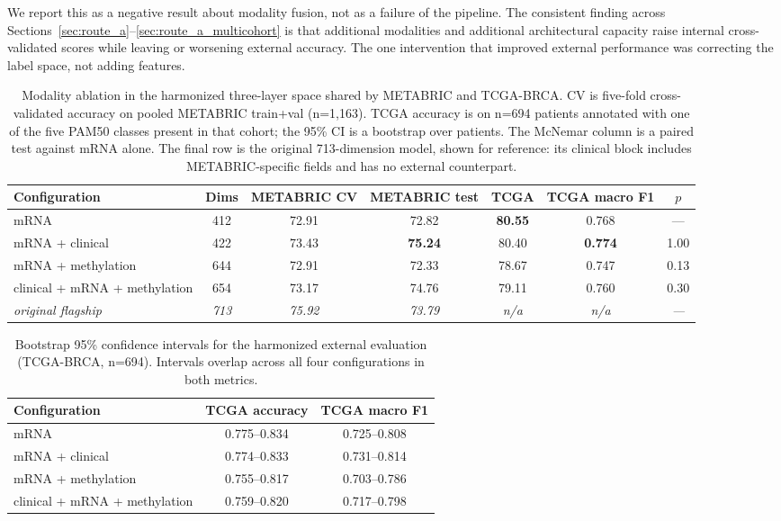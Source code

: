 \documentclass[11pt,a4paper]{article}
\begin{document}
We report this as a negative result about modality fusion, not as a failure of the pipeline. The
consistent finding across Sections~\ref{sec:route_a}--\ref{sec:route_a_multicohort} is that
additional modalities and additional architectural capacity raise internal cross-validated scores
while leaving or worsening external accuracy. The one intervention that improved external
performance was correcting the label space, not adding features.

\begin{table}[H]
\centering
\caption{Modality ablation in the harmonized three-layer space shared by METABRIC and TCGA-BRCA.
CV is five-fold cross-validated accuracy on pooled METABRIC train+val (n=1{,}163). TCGA accuracy
is on n=694 patients annotated with one of the five PAM50 classes present in that cohort; the
95\% CI is a bootstrap over patients. The McNemar column is a paired test against mRNA alone.
The final row is the original 713-dimension model, shown for reference: its clinical block
includes METABRIC-specific fields and has no external counterpart.}
\label{tab:multimodal_external}
\begin{tabular}{lcccccc}
\toprule
\textbf{Configuration} & \textbf{Dims} & \textbf{METABRIC CV} & \textbf{METABRIC test} &
\textbf{TCGA} & \textbf{TCGA macro F1} & \textbf{$p$} \\
\midrule
mRNA                       & 412 & 72.91 & 72.82 & \textbf{80.55} & 0.768 & --- \\
mRNA + clinical            & 422 & 73.43 & \textbf{75.24} & 80.40 & \textbf{0.774} & 1.00 \\
mRNA + methylation         & 644 & 72.91 & 72.33 & 78.67 & 0.747 & 0.13 \\
clinical + mRNA + methylation & 654 & 73.17 & 74.76 & 79.11 & 0.760 & 0.30 \\
\midrule
\emph{original flagship}   & \emph{713} & \emph{75.92} & \emph{73.79} & \emph{n/a} & \emph{n/a} & \emph{---} \\
\bottomrule
\end{tabular}
\end{table}

\begin{table}[H]
\centering
\caption{Bootstrap 95\% confidence intervals for the harmonized external evaluation (TCGA-BRCA,
n=694). Intervals overlap across all four configurations in both metrics.}
\label{tab:multimodal_ci}
\begin{tabular}{lcc}
\toprule
\textbf{Configuration} & \textbf{TCGA accuracy} & \textbf{TCGA macro F1} \\
\midrule
mRNA                       & 0.775--0.834 & 0.725--0.808 \\
mRNA + clinical            & 0.774--0.833 & 0.731--0.814 \\
mRNA + methylation         & 0.755--0.817 & 0.703--0.786 \\
clinical + mRNA + methylation & 0.759--0.820 & 0.717--0.798 \\
\bottomrule
\end{tabular}
\end{table}
\end{document}
